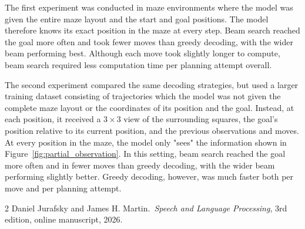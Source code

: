 \documentclass[12pt,a4paper]{article}
\begin{document}
	The first experiment was conducted in maze environments where the model was given 
	the entire maze layout and the start and goal positions.
	The model therefore knows its exact position in the maze at every step.
	Beam search reached the goal more often and took fewer moves than greedy decoding,
	with the wider beam performing best. Although each move took slightly longer to compute,
	beam search required less computation time per planning attempt overall.

	The second experiment compared the same decoding strategies, but used a larger training dataset
	consisting of trajectories which 
	the model was not given the complete maze layout or the coordinates of its position and the goal. 
	Instead, at each position, it received a $3\times3$ view of the surrounding squares, the goal’s 
	position relative to its current position, and the previous observations and moves. 
	At every position in the maze, the model only "sees" the information shown in 
	Figure~\ref{fig:partial_observation}.  
	In this setting, beam search reached the goal more often and in fewer moves than
	greedy decoding, with the wider beam performing slightly better. Greedy decoding,
	however, was much faster both per move and per planning attempt.

	\begin{thebibliography}{2}
		Daniel Jurafsky and James H. Martin.\ \textit{Speech and Language Processing}, 3rd edition, online manuscript, 2026.
	\end{thebibliography}


	
	
	
	
	
	
	

	
\end{document}
